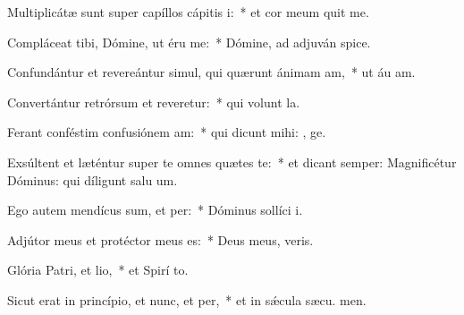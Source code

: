 \item Multiplicátæ sunt super capíllos cápitis i:~* et cor meum quit me.
\item Compláceat tibi, Dómine, ut éru me:~* Dómine, ad adjuván  spice.
\item Confundántur et revereántur simul, qui quærunt ánimam am,~* ut áu am.
\item Convertántur retrórsum et reveretur:~* qui volunt  la.
\item Ferant conféstim confusiónem am:~* qui dicunt mihi: , ge.
\item Exsúltent et læténtur super te omnes quætes te:~* et dicant semper: Magnificétur Dóminus: qui díligunt salu um.
\item Ego autem mendícus sum, et per:~* Dóminus sollíci  i.
\item Adjútor meus et protéctor meus  es:~* Deus meus,  veris.
\item Glória Patri, et lio,~* et Spirí to.
\item Sicut erat in princípio, et nunc, et per,~* et in sǽcula sæcu. men.
